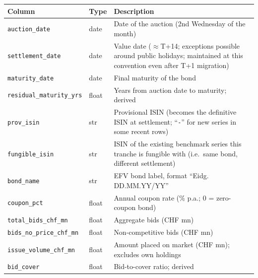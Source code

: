 \documentclass[12pt,a4paper]{article}
\begin{document}
\begin{longtable}{L{4.4cm} L{2.3cm} L{7.1cm}}
  \toprule
  \textbf{Column} & \textbf{Type} & \textbf{Description} \\
  \midrule
  \endhead
  \bottomrule
  \endfoot
  \texttt{auction\_date}          & date  & Date of the auction (2nd Wednesday
                                            of the month) \\[3pt]
  \texttt{settlement\_date}       & date  & Value date ($\approx$T+14; exceptions
                                            possible around public holidays;
                                            maintained at this convention even
                                            after T+1 migration) \\[3pt]
  \texttt{maturity\_date}         & date  & Final maturity of the bond \\[3pt]
  \texttt{residual\_maturity\_yrs}& float & Years from auction date to maturity;
                                            derived \\[3pt]
  \texttt{prov\_isin}             & str   & Provisional ISIN (becomes the
                                            definitive ISIN at settlement;
                                            ``\texttt{-}'' for new series in
                                            some recent rows) \\[3pt]
  \texttt{fungible\_isin}         & str   & ISIN of the existing benchmark
                                            series this tranche is fungible
                                            with (i.e.\ same bond, different
                                            settlement) \\[3pt]
  \texttt{bond\_name}             & str   & EFV bond label, format
                                            ``Eidg.\,DD.MM.YY/YY'' \\[3pt]
  \texttt{coupon\_pct}            & float & Annual coupon rate (\% p.a.;
                                            0 = zero-coupon bond) \\[3pt]
  \texttt{total\_bids\_chf\_mn}   & float & Aggregate bids (CHF mn) \\[3pt]
  \texttt{bids\_no\_price\_chf\_mn} & float & Non-competitive bids (CHF mn) \\[3pt]
  \texttt{issue\_volume\_chf\_mn} & float & Amount placed on market (CHF mn);
                                            excludes own holdings \\[3pt]
  \texttt{bid\_cover}             & float & Bid-to-cover ratio; derived \\[3pt]

\end{longtable}
\end{document}
